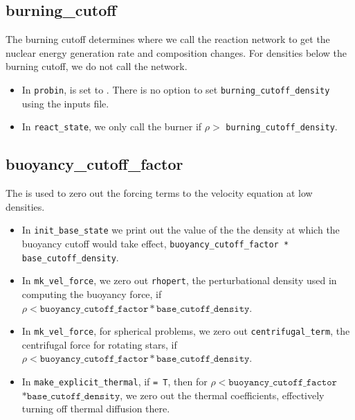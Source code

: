\subsection{burning\_cutoff}

The burning cutoff determines where we call the reaction network to
get the nuclear energy generation rate and composition changes.  For
densities below the burning cutoff, we do not call the network.

\begin{itemize}

\item In {\tt probin},  is set to 
  .  There is no option to set 
  {\tt burning\_cutoff\_density} using the inputs file.

\item In {\tt react\_state}, we only call the burner if 
  $\rho >$ {\tt burning\_cutoff\_density}.


\end{itemize}


\subsection{buoyancy\_cutoff\_factor}

The  is used to zero out the forcing terms
to the velocity equation at low densities.

\begin{itemize}

\item In {\tt init\_base\_state} we print out the value of the
   the density at which the buoyancy cutoff would take effect,
   {\tt buoyancy\_cutoff\_factor * base\_cutoff\_density}.

\item In {\tt mk\_vel\_force}, we zero out {\tt rhopert}, the
   perturbational density used in computing the buoyancy force,
   if $\rho < \mathtt{buoyancy\_cutoff\_factor * base\_cutoff\_density}$.

\item In {\tt mk\_vel\_force}, for spherical problems, we 
   zero out {\tt centrifugal\_term}, the centrifugal force for
   rotating stars, if $\rho < \mathtt{buoyancy\_cutoff\_factor *
   base\_cutoff\_density}$.

\item In {\tt make\_explicit\_thermal}, if  {\tt = T}, then for 
$\rho < \mathtt{buoyancy\_cutoff\_factor}$ \\ $* \mathtt{base\_cutoff\_density}$, we
zero out the thermal coefficients, effectively turning off thermal
diffusion there.

\end{itemize}





